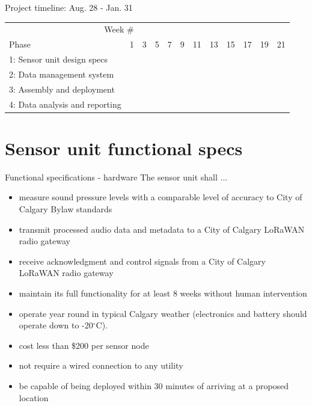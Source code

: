 \documentclass{beamer}
\begin{document}
    \begin{frame}{Project timeline: Aug. 28 - Jan. 31}
        \begin{center}
        \scriptsize{\begin{tabular}{l|p{0.1cm}p{0.1cm}p{0.1cm}p{0.1cm}p{0.1cm}p{0.1cm}p{0.1cm}p{0.1cm}p{0.1cm}p{0.1cm}p{0.1cm}|}
                 \multicolumn{2}{r}{Week \#} & \multicolumn{10}{c}{} 
                \\ Phase & 1 & 3 & 5 & 7 & 9 & 11 & 13 & 15 & 17 & 19 & 21 \\ \hline 
                1: Sensor unit design specs & \cellcolor{cyan} & \cellcolor{cyan} & \cellcolor{cyan} & \cellcolor{cyan} & \cellcolor{cyan} & \cellcolor{cyan} & & & & & \\ \cline{1-1}
                2: Data management system &  & & \cellcolor{cyan} & \cellcolor{cyan} & \cellcolor{cyan} & \cellcolor{cyan} & \cellcolor{cyan} & \cellcolor{cyan} & & & \\ \cline{1-1} 
                3: Assembly and deployment & &  &  &  &  & &  & \cellcolor{cyan} & \cellcolor{cyan} & \cellcolor{cyan} & \cellcolor{cyan} \\  \cline{1-1} 
                4: Data analysis and reporting & & & &  & & & & & & \cellcolor{cyan} & \cellcolor{cyan}  \\ \hline
            \end{tabular}} 
            \end{center}
    \end{frame}

\section{Sensor unit functional specs}

    \begin{frame}{Functional specifications - hardware}
    The sensor unit shall ... 
        \begin{itemize}
            \item measure sound pressure levels with a comparable level of accuracy to City of Calgary Bylaw standards 
            \item transmit processed audio data and metadata to a City of Calgary LoRaWAN radio gateway
            \item receive acknowledgment and control signals from a City of Calgary LoRaWAN radio gateway
            \item maintain its full functionality for at least 8 weeks without human intervention
            \item operate year round in typical Calgary weather (electronics and battery should operate down to -20$^\circ$C). 
            \item cost less than \$200 per sensor node
            \item not require a wired connection to any utility
            \item be capable of being deployed within 30 minutes of arriving at a proposed location
        \end{itemize}
    \end{frame}
    
\end{document}
